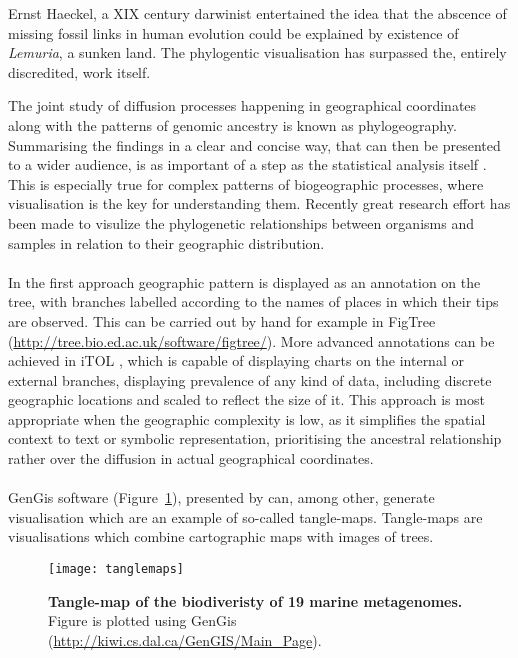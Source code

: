 Ernst Haeckel, a XIX century darwinist entertained the idea that the abscence of missing fossil links in human evolution could be explained by existence of \textit{Lemuria}, a sunken land.  
The phylogentic visualisation has surpassed the, entirely discredited, work itself.

The joint study of diffusion processes happening in geographical coordinates along with the patterns of genomic ancestry is known as phylogeography.
Summarising the findings in a clear and concise way, that can then be presented to a wider audience, is as important of a step as the statistical analysis itself \citep{Hadley2010}.
This is especially true for complex patterns of biogeographic processes, where visualisation is the key for understanding them. 
Recently great research effort has been made to visulize the phylogenetic relationships between organisms and samples in relation to their geographic distribution. 

\paragraph{}
In the first approach geographic pattern is displayed as an annotation on the tree, with branches labelled according to the names of places in which their tips are observed.
This can be carried out by hand for example in FigTree (\url{http://tree.bio.ed.ac.uk/software/figtree/}).
More advanced annotations can be achieved in iTOL \citep{itol}, which is capable of displaying charts on the internal or external branches, displaying prevalence of any kind of data, including discrete geographic locations and scaled to reflect the size of it.
This approach is most appropriate when the geographic complexity is low, as it simplifies the spatial context to text or symbolic representation, prioritising the ancestral relationship rather over the diffusion in actual geographical coordinates.

\paragraph{}
GenGis software (Figure~\ref{fig:tanglemaps}), presented by \cite{Parks2009} can, among other, generate visualisation which are an example of so-called tangle-maps.
Tangle-maps are visualisations which combine cartographic maps with images of trees.

\begin{figure}[H]
\centering
\texttt{[image: tanglemaps]}
\caption{
{ \footnotesize 
{\bf Tangle-map of the biodiveristy of 19 marine metagenomes.} 
Figure is plotted using GenGis (\url{http://kiwi.cs.dal.ca/GenGIS/Main_Page}).
} %
}
\label{fig:tanglemaps}
\end{figure}

